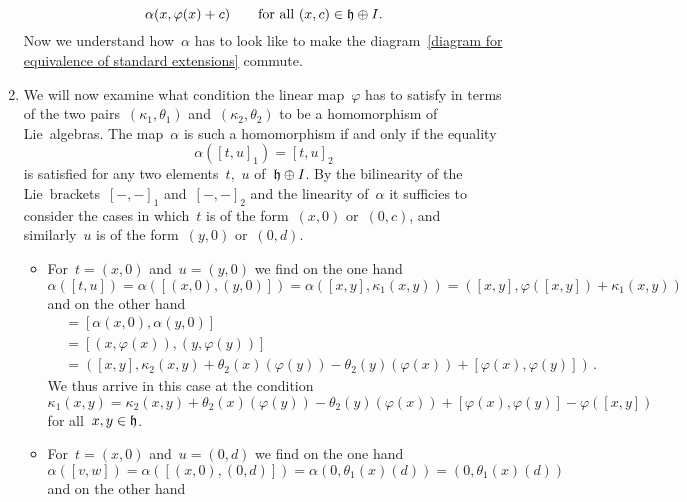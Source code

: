 \begin{fluff}
\begin{enumerate}[resume*]
\[        \alpha(x, \varphi(x) + c)
        \qquad
        \text{for all~$(x,c) \in \mathfrak{h} \oplus I$.}
      \]
      Now we understand how~$\alpha$ has to look like to make the diagram~\eqref{diagram for equivalence of standard extensions} commute.
    \item
      We will now examine what condition the linear map~$\varphi$ has to satisfy in terms of the two pairs~$(\kappa_1, \theta_1)$ and~$(\kappa_2, \theta_2)$ to be a homomorphism of Lie~algebras.
      The map~$\alpha$ is such a homomorphism if and only if the equality
      \[
        \alpha( [ t, u ]_1 )
        =
        [ t, u ]_2
      \]
      is satisfied for any two elements~$t$,~$u$ of~$\mathfrak{h} \oplus I$.
      By the bilinearity of the Lie~brackets~$[-,-]_1$ and~$[-,-]_2$ and the linearity of~$\alpha$ it sufficies to consider the cases in which~$t$ is of the form~$(x,0)$ or~$(0,c)$, and similarly~$u$ is of the form~$(y,0)$ or~$(0,d)$.
      \begin{itemize}
        \item
          For~$t = (x,0)$ and~$u = (y,0)$ we find on the one hand
          \[
            \alpha( [t,u] )
            =
            \alpha( [ (x,0) , (y,0) ] )
            =
            \alpha( [x,y], \kappa_1(x,y) )
            =
            ( [x,y], \varphi( [x,y] ) + \kappa_1(x,y) )
          \]
          and on the other hand
          \begin{align*}
            [ \alpha(t), \alpha(u) ]
            &=
            [ \alpha(x,0), \alpha(y,0) ]
            \\
            &=
            [ (x, \varphi(x)), (y, \varphi(y)) ]
            \\
            &=
            ( [x,y], \kappa_2(x,y) + \theta_2(x)(\varphi(y)) - \theta_2(y)(\varphi(x)) + [\varphi(x), \varphi(y)] ) \,.
          \end{align*}
          We thus arrive in this case at the condition
          \[
            \kappa_1(x,y)
            =
            \kappa_2(x,y)
            + \theta_2(x)(\varphi(y))
            - \theta_2(y)(\varphi(x))
            + [\varphi(x), \varphi(y)]
            - \varphi( [x,y] )
          \]
          for all~$x, y \in \mathfrak{h}$.
        \item
          For~$t = (x,0)$ and~$u = (0,d)$ we find on the one hand
          \[
            \alpha( [v,w] )
            =
            \alpha( [ (x,0), (0,d) ] )
            =
            \alpha( 0, \theta_1(x)(d) )
            =
            (0, \theta_1(x)(d))
          \]
          and on the other hand

\end{itemize}
\end{enumerate}
\end{fluff}
